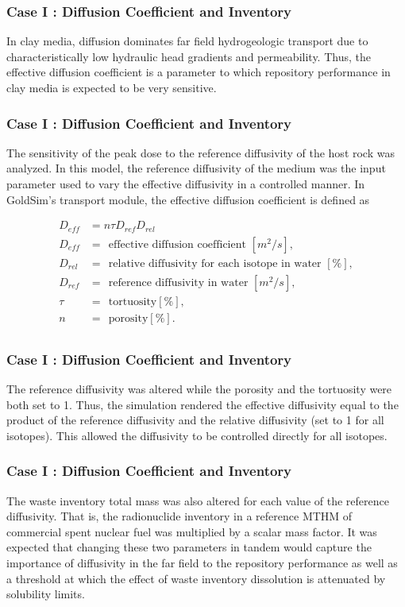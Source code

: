 
\begin{frame}[c]
  \frametitle{Case I : Diffusion Coefficient and Inventory}
In clay media, diffusion dominates far field hydrogeologic transport due to 
characteristically low hydraulic head gradients and permeability. Thus, the effective diffusion 
coefficient is a parameter to which repository performance in clay media is 
expected to be very sensitive. 
\end{frame}

\begin{frame}[c]
  \frametitle{Case I : Diffusion Coefficient and Inventory}
The sensitivity of the peak dose to the reference diffusivity of the 
host rock was analyzed.  In this model, the reference diffusivity of the medium 
was the input parameter used to vary the effective diffusivity in a controlled 
manner. In GoldSim's transport module, the effective diffusion coefficient is 
defined as 

\begin{align}\label{diffcoeff}
  D_{eff} &= n\tau D_{ref}D_{rel} \\ %
       D_{eff} &= ~~\mbox{effective diffusion coefficient }[m^2/s],\nonumber\\
       D_{rel} &= ~~\mbox{relative diffusivity for each isotope in water }[\%],\nonumber\\
       D_{ref} &= ~~\mbox{reference diffusivity in water }[m^2/s],\nonumber\\
       \tau &= ~~\mbox{tortuosity} [\%], \nonumber \\ 
       n &= ~~\mbox{porosity}[\%].\nonumber\\
  \label{GDSEdiff}
\end{align}

\begin{frame}[c]
  \frametitle{Case I : Diffusion Coefficient and Inventory}
The reference diffusivity was altered while the porosity and the tortuosity 
were both set to 1. Thus, the simulation rendered the effective diffusivity 
equal to the product of the reference diffusivity and the relative diffusivity 
(set to 1 for all isotopes).  This allowed the diffusivity to be controlled 
directly for all isotopes.

\begin{frame}[c]
  \frametitle{Case I : Diffusion Coefficient and Inventory}
The waste inventory total mass was also altered for each value of the reference 
diffusivity.  That is, the radionuclide inventory in a reference 
\gls{MTHM} of commercial spent nuclear fuel was multiplied by a scalar mass factor.  
It was expected that changing these two parameters in tandem would capture the 
importance of diffusivity in the far field to the repository performance 
as well as a threshold at which the effect of waste inventory dissolution is 
attenuated by solubility limits.


\end{frame}
\end{frame}
\end{frame}
